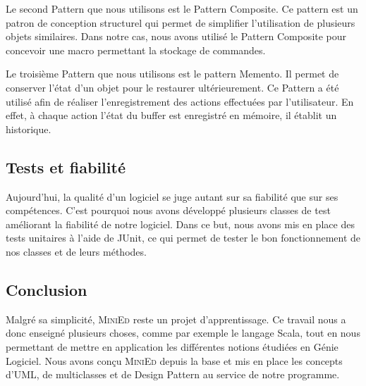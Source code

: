 \documentclass[a4paper]{article}
\begin{document}
		\vspace{0.5cm}

		Le second Pattern que nous utilisons est le Pattern Composite. Ce pattern est un patron de conception structurel qui permet de simplifier l'utilisation de plusieurs objets similaires. Dans notre cas, nous avons utilisé le Pattern Composite pour concevoir une macro permettant la stockage de commandes.

		\vspace{0.5cm}

		Le troisième Pattern que nous utilisons est le pattern Memento. Il permet de conserver l’état d’un objet pour le restaurer ultérieurement. Ce Pattern a été utilisé afin de réaliser l’enregistrement des actions effectuées par l’utilisateur. En effet, à chaque action l’état du buffer est enregistré en mémoire, il établit un historique.

		\vspace{0.5cm}

		\subsection{Tests et fiabilité}

		\vspace{0.5cm}

		Aujourd’hui, la qualité d’un logiciel se juge autant sur sa fiabilité que sur ses compétences. C’est pourquoi nous avons développé plusieurs classes de test améliorant la fiabilité de notre logiciel. Dans ce but, nous avons mis en place des tests unitaires à l’aide de JUnit, ce qui permet de tester le bon fonctionnement de nos classes et de leurs méthodes.

		\vspace{0.5cm}


	\begin{center}
		\section{Conclusion}
	\end{center}

	\vspace{0.5cm}

	Malgré sa simplicité, \textsc{MiniEd} reste un projet d'apprentissage. Ce travail nous a donc enseigné plusieurs choses, comme par exemple le langage Scala, tout en nous permettant de mettre en application les différentes notions étudiées en Génie Logiciel. Nous avons conçu \textsc{MiniEd} depuis la base et mis en place les concepts d'UML, de multiclasses et de Design Pattern au service de notre programme.
\end{document}
